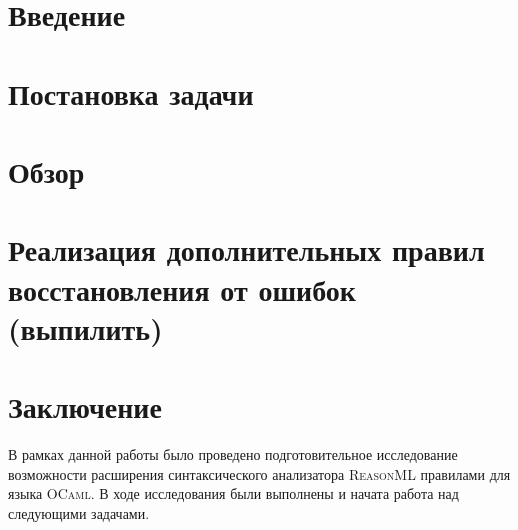 
\usepackage{newfloat,caption,float}
\usepackage{newfloat}
\usepackage{subcaption}

\captionsetup[example]{labelfont=bf}


\captionsetup[subexample]{labelformat=simple}

\newcommand{\ReasonML}{\textsc{ReasonML}}
\newcommand{\OCaml}{\textsc{OCaml}}
\newcommand{\ocamllex}{\textsc{ocamllex}}
\newcommand{\ocamlyacc}{\textsc{ocamlyacc}}
\newcommand{\merlin}{\textsc{merlin}}





\maketitle
\setcounter{tocdepth}{2}
\tableofcontents

\section{Введение}


\section{Постановка задачи}
\label{sec:task}


\section{Обзор}


\section{Реализация дополнительных правил восстановления от ошибок (выпилить)}


\section{Заключение}
В рамках данной работы было проведено подготовительное исследование возможности расширения синтаксического анализатора \ReasonML{} правилами для языка \OCaml{}. В ходе исследования были выполнены и начата работа над следующими задачами.


